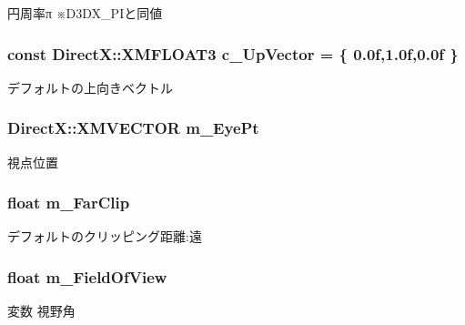 円周率π ※\+D3\+D\+X\+\_\+\+P\+Iと同値 
\subsubsection[{\texorpdfstring{c\+\_\+\+Up\+Vector}{c_UpVector}}]{\setlength{\rightskip}{0pt plus 5cm}const Direct\+X\+::\+X\+M\+F\+L\+O\+A\+T3 c\+\_\+\+Up\+Vector = \{ 0.\+0f,1.\+0f,0.\+0f \}\hspace{0.3cm}{\ttfamily [static]}}\hypertarget{class_camera_adf00fed6aca14c9362356375d267251b}{}\label{class_camera_adf00fed6aca14c9362356375d267251b}
デフォルトの上向きベクトル 
\subsubsection[{\texorpdfstring{m\+\_\+\+Eye\+Pt}{m_EyePt}}]{\setlength{\rightskip}{0pt plus 5cm}Direct\+X\+::\+X\+M\+V\+E\+C\+T\+OR m\+\_\+\+Eye\+Pt\hspace{0.3cm}{\ttfamily [private]}}\hypertarget{class_camera_a80c72afef85ca175279420cce520370d}{}\label{class_camera_a80c72afef85ca175279420cce520370d}
視点位置 
\subsubsection[{\texorpdfstring{m\+\_\+\+Far\+Clip}{m_FarClip}}]{\setlength{\rightskip}{0pt plus 5cm}float m\+\_\+\+Far\+Clip\hspace{0.3cm}{\ttfamily [private]}}\hypertarget{class_camera_a803e5e33c136572ec2c31b221d2ce67f}{}\label{class_camera_a803e5e33c136572ec2c31b221d2ce67f}
デフォルトのクリッピング距離\+:遠 
\subsubsection[{\texorpdfstring{m\+\_\+\+Field\+Of\+View}{m_FieldOfView}}]{\setlength{\rightskip}{0pt plus 5cm}float m\+\_\+\+Field\+Of\+View\hspace{0.3cm}{\ttfamily [private]}}\hypertarget{class_camera_a61ed8246ec6d6d78b046d88f3f5b8bc0}{}\label{class_camera_a61ed8246ec6d6d78b046d88f3f5b8bc0}
変数 視野角 
